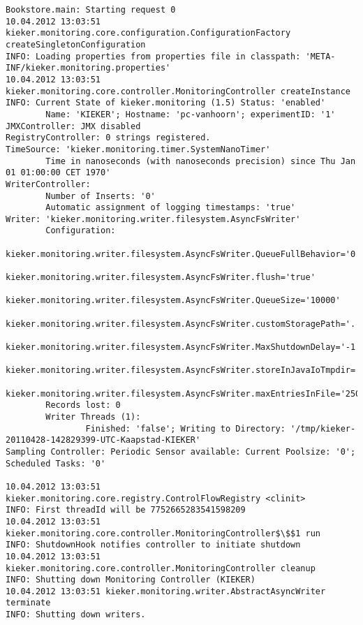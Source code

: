 \setTextListing
\begin{lstlisting}[caption=Execution of the Bookstore with AspectJ trace instrumentation (Section~\ref{sec:traceAnalysis:instr:AspectJ})]
Bookstore.main: Starting request 0
10.04.2012 13:03:51 kieker.monitoring.core.configuration.ConfigurationFactory createSingletonConfiguration
INFO: Loading properties from properties file in classpath: 'META-INF/kieker.monitoring.properties'
10.04.2012 13:03:51 kieker.monitoring.core.controller.MonitoringController createInstance
INFO: Current State of kieker.monitoring (1.5) Status: 'enabled'
        Name: 'KIEKER'; Hostname: 'pc-vanhoorn'; experimentID: '1'
JMXController: JMX disabled
RegistryController: 0 strings registered.
TimeSource: 'kieker.monitoring.timer.SystemNanoTimer'
        Time in nanoseconds (with nanoseconds precision) since Thu Jan 01 01:00:00 CET 1970'
WriterController:
        Number of Inserts: '0'
        Automatic assignment of logging timestamps: 'true'
Writer: 'kieker.monitoring.writer.filesystem.AsyncFsWriter'
        Configuration:
                kieker.monitoring.writer.filesystem.AsyncFsWriter.QueueFullBehavior='0'
                kieker.monitoring.writer.filesystem.AsyncFsWriter.flush='true'
                kieker.monitoring.writer.filesystem.AsyncFsWriter.QueueSize='10000'
                kieker.monitoring.writer.filesystem.AsyncFsWriter.customStoragePath='.'
                kieker.monitoring.writer.filesystem.AsyncFsWriter.MaxShutdownDelay='-1'
                kieker.monitoring.writer.filesystem.AsyncFsWriter.storeInJavaIoTmpdir='true'
                kieker.monitoring.writer.filesystem.AsyncFsWriter.maxEntriesInFile='25000'
        Records lost: 0
        Writer Threads (1): 
                Finished: 'false'; Writing to Directory: '/tmp/kieker-20110428-142829399-UTC-Kaapstad-KIEKER'
Sampling Controller: Periodic Sensor available: Current Poolsize: '0'; Scheduled Tasks: '0'

10.04.2012 13:03:51 kieker.monitoring.core.registry.ControlFlowRegistry <clinit>
INFO: First threadId will be 7752665283541598209
10.04.2012 13:03:51 kieker.monitoring.core.controller.MonitoringController$\$$1 run
INFO: ShutdownHook notifies controller to initiate shutdown
10.04.2012 13:03:51 kieker.monitoring.core.controller.MonitoringController cleanup
INFO: Shutting down Monitoring Controller (KIEKER)
10.04.2012 13:03:51 kieker.monitoring.writer.AbstractAsyncWriter terminate
INFO: Shutting down writers.
\end{lstlisting}


